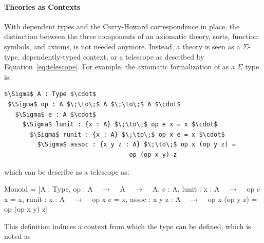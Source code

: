 \paragraph{Theories as Contexts}
With dependent types and the Curry-Howard correspondence in place, the distinction between the three components of an axiomatic theory, sorts, function symbols, and axioms, is not needed anymore. Instead, a theory is seen as a $\Sigma$-type, dependently-typed context, or a telescope as described by Equation~\ref{eq:telescope}. 
For example, the axiomatic formalization of  as a $\Sigma$ type is: 
\begin{lstlisting}[mathescape]
$\Sigma$ A : Type $\cdot$ 
 $\Sigma$ op : A $\;\to\;$ A $\;\to\;$ A $\cdot$ 
   $\Sigma$ e : A $\cdot$  
     $\Sigma$ lunit : {x : A} $\;\to\;$ op e x = x $\cdot$
       $\Sigma$ runit : {x : A} $\;\to\;$ op x e = x $\cdot$
         $\Sigma$ assoc : {x y z : A} $\;\to\;$ op x (op y z) = 
                                  op (op x y) z
\end{lstlisting} 
\noindent which can be describe as a telescope as:  
\begin{togcode} 
Monoid = [A : Type, op : A ~$\;\to\;$~ A ~$\;\to\;$~ A, e : A, 
          lunit : {x : A} ~$\;\to\;$~ op e x = x, 
          runit : {x : A} ~$\;\to\;$~ op x e = x, 
          assoc : {x y z : A} ~$\;\to\;$~ op x (op y z) = op (op x y) z] 
\end{togcode} 
\noindent This definition induces a context from which the type  can be defined, which is noted as   



